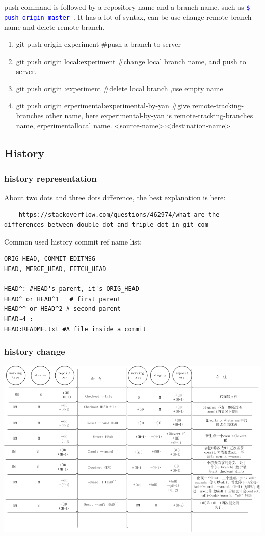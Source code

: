 \documentclass[paper=8.5in:11in, twoside, 12pt, pagesize=pdftex]{book}
\newcommand{\linuxcommand}[1]{\texttt{\textcolor{blue}{\$ #1 \Pisymbol{psy}{191}}}}
\begin{document}
	push command is followed by a repository name and a branch name.  such as \linuxcommand{push origin master}. It has a lot of syntax, can be use change remote branch name and delete remote branch.
	\begin{enumerate}
		\item git push origin experiment \#push a branch to server
		\item git push origin local:experiment \#change local branch name, and push to server. 
		\item git push origin :experiment \#delete local branch ,use empty name 
		\item git push origin erperimental:experimental-by-yan \#give remote-tracking-branches other name, here experimental-by-yan is remote-tracking-branches name, erperimentallocal name. <source-name>:<destination-name>
	\end{enumerate}
	




\subsection{History}
\subsubsection{history representation}

	About two dots and three dots difference, the best explanation is here:
\begin{lstlisting}
	https://stackoverflow.com/questions/462974/what-are-the-differences-between-double-dot-and-triple-dot-in-git-com
\end{lstlisting}


	Common used history commit ref name list: 
\begin{lstlisting}
ORIG_HEAD, COMMIT_EDITMSG
HEAD, MERGE_HEAD, FETCH_HEAD

HEAD^: #HEAD's parent, it's ORIG_HEAD
HEAD^ or HEAD^1   # first parent
HEAD^^ or HEAD^2 # second parent
HEAD~4 : 
HEAD:README.txt #A file inside a commit	
\end{lstlisting}	


\subsubsection{history change}
\includegraphics[scale=0.6]{pics/Git-history} \\
\end{document}

